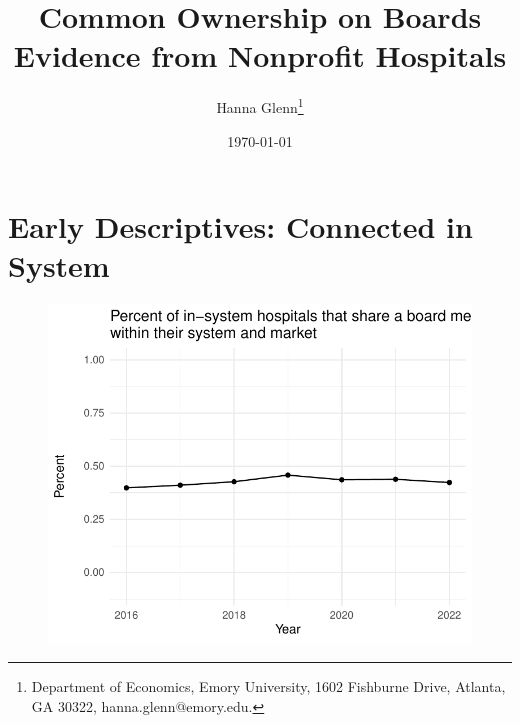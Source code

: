 \documentclass[12pt]{article}
\begin{document}
	
	
	
	
	\linespread{1.2}\title{\vspace{-0.5in} Common Ownership on Boards\\ \large Evidence from Nonprofit Hospitals} 
	
	\date{\today}
	
	\author{\vspace{10mm}Hanna Glenn\footnote{Department of Economics, Emory University, 1602 Fishburne Drive, Atlanta, GA 30322, hanna.glenn@emory.edu.} }
	
	\maketitle
	
	\singlespacing

    \vspace{3mm}
	
    \begin{abstract}
		{\small
          
		} 
	\end{abstract}
	
	
	
	
	

	
	\onehalfspacing
	
	\newpage


    \section{Early Descriptives: Connected in System}

    \begin{figure}[ht!]
        \centering
        \includegraphics[width=\textwidth]{Objects/connected_systems_percent.pdf}
    \end{figure}
\end{document}
